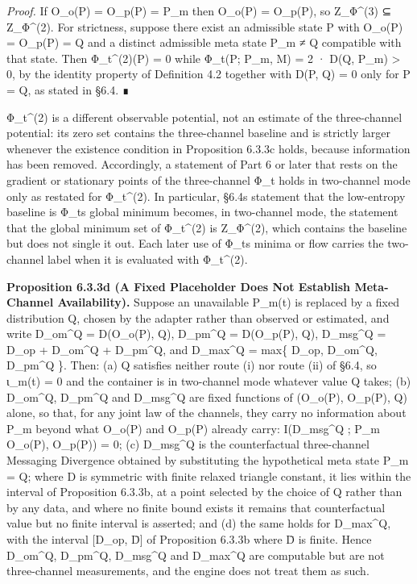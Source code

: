 \documentclass[
]{article}
\begin{document}
\emph{Proof.} If O\_o(P) = O\_p(P) = P\_m then O\_o(P) = O\_p(P), so
Z\_Φ\^{}(3) ⊆ Z\_Φ\^{}(2). For strictness, suppose there exist an
admissible state P with O\_o(P) = O\_p(P) = Q and a distinct admissible
meta state P\_m ≠ Q compatible with that state. Then Φ\_t\^{}(2)(P) = 0
while Φ\_t(P; P\_m, M) = 2 · D(Q, P\_m) \textgreater{} 0, by the
identity property of Definition 4.2 together with D(P, Q) = 0 only for P
= Q, as stated in §6.4. ∎

Φ\_t\^{}(2) is a different observable potential, not an estimate of the
three-channel potential: its zero set contains the three-channel
baseline and is strictly larger whenever the existence condition in
Proposition 6.3.3c holds, because information has been removed.
Accordingly, a statement of Part 6 or later that rests on the gradient
or stationary points of the three-channel Φ\_t holds in two-channel mode
only as restated for Φ\_t\^{}(2). In particular, §6.4\textquotesingle s
statement that the low-entropy baseline is Φ\_t\textquotesingle s global
minimum becomes, in two-channel mode, the statement that the global
minimum set of Φ\_t\^{}(2) is Z\_Φ\^{}(2), which contains the baseline
but does not single it out. Each later use of Φ\_t\textquotesingle s
minima or flow carries the two-channel label when it is evaluated with
Φ\_t\^{}(2).

\textbf{Proposition 6.3.3d (A Fixed Placeholder Does Not Establish
Meta-Channel Availability).} Suppose an unavailable P\_m(t) is replaced
by a fixed distribution Q, chosen by the adapter rather than observed or
estimated, and write D\_om\^{}Q = D(O\_o(P), Q), D\_pm\^{}Q = D(O\_p(P),
Q), D\_msg\^{}Q = D\_op + D\_om\^{}Q + D\_pm\^{}Q, and D\_max\^{}Q =
max\{ D\_op, D\_om\^{}Q, D\_pm\^{}Q \}. Then: (a) Q satisfies neither
route (i) nor route (ii) of §6.4, so ι\_m(t) = 0 and the container is in
two-channel mode whatever value Q takes; (b) D\_om\^{}Q, D\_pm\^{}Q and
D\_msg\^{}Q are fixed functions of (O\_o(P), O\_p(P), Q) alone, so that,
for any joint law of the channels, they carry no information about P\_m
beyond what O\_o(P) and O\_p(P) already carry: I(D\_msg\^{}Q ; P\_m
\textbar{} O\_o(P), O\_p(P)) = 0; (c) D\_msg\^{}Q is the counterfactual
three-channel Messaging Divergence obtained by substituting the
hypothetical meta state P\_m = Q; where D is symmetric with finite
relaxed triangle constant, it lies within the interval of Proposition
6.3.3b, at a point selected by the choice of Q rather than by any data,
and where no finite bound exists it remains that counterfactual value
but no finite interval is asserted; and (d) the same holds for
D\_max\^{}Q, with the interval {[}D\_op, D̄{]} of Proposition 6.3.3b
where D̄ is finite. Hence D\_om\^{}Q, D\_pm\^{}Q, D\_msg\^{}Q and
D\_max\^{}Q are computable but are not three-channel measurements, and
the engine does not treat them as such.
\end{document}

